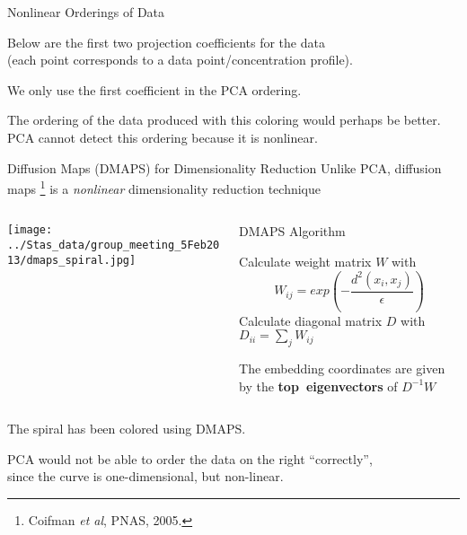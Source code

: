 \begin{frame}{Nonlinear Orderings of Data}

	\centering
	Below are the first two projection coefficients for the data \\
	(each point corresponds to a data point/concentration profile).
	
    \centering
	
    We only use the first coefficient in the PCA ordering.
	\pause
	
	The ordering of the data produced with this coloring would perhaps be better. \\
    PCA cannot detect this ordering because it is nonlinear.
    
\end{frame}

\begin{frame}{Diffusion Maps (DMAPS) for Dimensionality Reduction}
\centering
Unlike PCA, diffusion maps \footnote{ \tiny Coifman {\em et al}, PNAS, 2005.} is a {\em nonlinear} dimensionality reduction technique

	\begin{columns}
	\begin{column}{0.4\textwidth}
		\texttt{[image: ../Stas\_data/group\_meeting\_5Feb2013/dmaps\_spiral.jpg]}
	\end{column}
	\begin{column}{0.5\textwidth}
	\begin{block}{DMAPS Algorithm}
		{\scriptsize 
		Calculate weight matrix $W$ with
		$$W_{ij} = exp\left( -\frac{d^2(x_i, x_j)}{\epsilon} \right)$$
		Calculate diagonal matrix $D$ with $D_{ii} = \sum_j W_{ij}$
		
		The embedding coordinates are given by the {\bf top~eigenvectors} of $D^{-1}W$
		\par}
	\end{block}
	\end{column}
	\end{columns}

\vspace{0.2in}

The spiral has been colored using DMAPS.

PCA would not be able to order the data on the right ``correctly'', \\since the curve is one-dimensional, but non-linear.

\end{frame}

